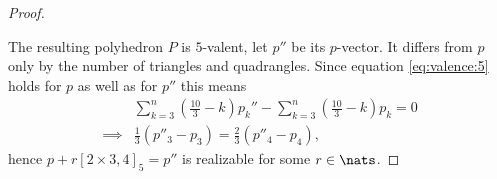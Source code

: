 \begin{theorem}
\begin{proof}
\begin{figure}[hptt]
   \end{figure}
   The resulting polyhedron $P$ is $5$-valent, let $p''$ be its $p$-vector. It differs from $p$ only by the number of triangles and quadrangles. Since equation \autoref{eq:valence:5} holds for $p$ as well as for $p''$ this means
   \begin{align*}
     & \sum_{k=3}^n \left( \frac{10}{3} - k \right) p_k'' - \sum_{k=3}^n \left( \frac{10}{3} - k \right) p_k = 0 \\
     \implies& \frac{1}{3} (p''_3 - p_3) = \frac{2}{3} (p''_4 - p_4),
   \end{align*}
   hence $p + r [2 \times 3, 4]_5 = p''$ is realizable for some $r \in \nats$.
  \end{proof}
\end{theorem}

